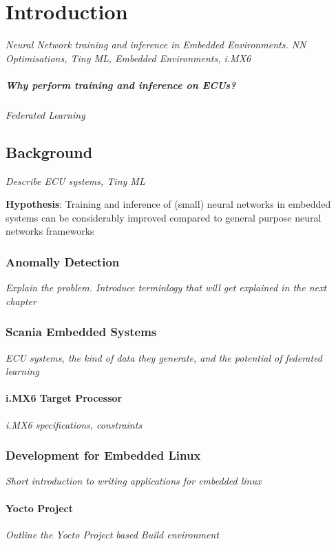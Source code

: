 \part{Introduction}

\textit{Neural Network training and inference in Embedded Environments. NN Optimisations, Tiny ML, Embedded Environments, i.MX6}

\subsubsection{Why perform training and inference on ECUs?}
\textit{Federated Learning}

\chapter{Background}
\textit{Describe ECU systems, Tiny ML}

\vspace{1em}
\noindent \textbf{Hypothesis}: Training and inference of (small) neural networks in embedded systems can be considerably improved compared to general purpose neural networks frameworks

\section{Anomally Detection}
\textit{Explain the problem. Introduce terminlogy that will get explained in the next chapter}

\section{Scania Embedded Systems}
\textit{ECU systems, the kind of data they generate, and the potential of federated learning}

\subsection{i.MX6 Target Processor}
\textit{i.MX6 specifications, constraints}

\section{Development for Embedded Linux}
\textit{Short introduction to writing applications for embedded linux}

\subsection{Yocto Project}
\textit{Outline the Yocto Project based Build environment}

